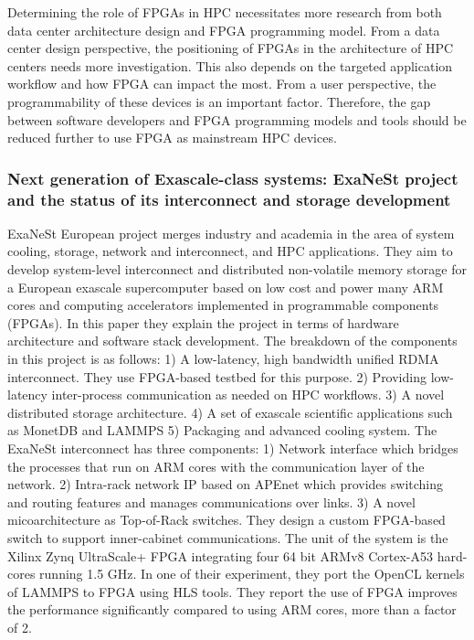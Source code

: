 Determining the role of FPGAs in HPC necessitates more research from both data center architecture design and FPGA programming model.
From a data center design perspective, the positioning of FPGAs in the architecture of HPC centers needs more investigation. This also depends on the targeted application workflow and how FPGA can impact the most.    
From a user perspective, the programmability of these devices is an important factor. Therefore, the gap between software developers and FPGA programming models and tools should be reduced further to use FPGA as mainstream HPC devices.

\iffalse
\subsubsection{Next generation of Exascale-class systems: ExaNeSt project and the status of its interconnect and storage development}
ExaNeSt European project merges industry and academia in the area of system cooling, storage, network and interconnect, and HPC applications. They aim to develop system-level interconnect and distributed non-volatile memory storage for a European exascale supercomputer based on low cost and power many ARM cores and computing accelerators implemented in programmable components (FPGAs). In this paper they explain the project in terms of hardware architecture and software stack development. The breakdown of the components in this project is as follows: 1) A low-latency, high bandwidth unified RDMA interconnect. They use FPGA-based testbed for this purpose. 2) Providing low-latency inter-process communication as needed on HPC workflows. 3) A novel distributed storage architecture. 4) A set of exascale scientific applications such as MonetDB and LAMMPS 5) Packaging and advanced cooling system.
The ExaNeSt interconnect has three components: 1) Network interface which bridges the processes that run on ARM cores with the communication layer of the network. 2) Intra-rack network IP based on APEnet which provides switching and routing features and manages communications over links. 3) A novel micoarchitecture as Top-of-Rack switches. They design a custom FPGA-based switch to support inner-cabinet communications.
The unit of the system is the Xilinx Zynq UltraScale+ FPGA integrating four 64 bit ARMv8 Cortex-A53 hard-cores running 1.5 GHz. 
In one of their experiment, they port the OpenCL kernels of LAMMPS to FPGA using HLS tools. They report the use of FPGA improves the performance significantly compared to using ARM cores, more than a factor of 2. 

